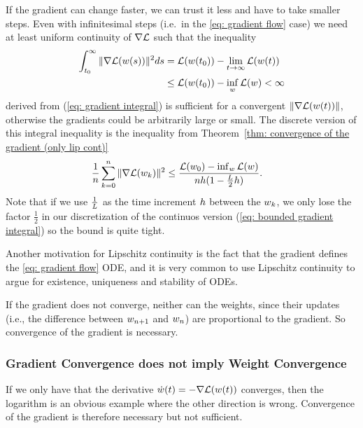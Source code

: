 If the gradient can change faster, we can trust it less and have to take smaller
steps. Even with infinitesimal steps (i.e.\ in the \ref{eq: gradient flow} case)
we need at least uniform continuity of \(\nabla\mathcal{L}\) such that the inequality
\begin{align}\label{eq: bounded gradient integral}
	\int_{t_0}^\infty \|\nabla \mathcal{L}(w(s))\|^2 ds
	&= \mathcal{L}(w(t_0)) - \lim_{t\to\infty} \mathcal{L}(w(t)) \\
	&\le \mathcal{L}(w(t_0)) - \inf_{w} \mathcal{L}(w) < \infty \nonumber
\end{align}
%
derived from (\ref{eq: gradient integral}) is sufficient for a convergent
\(\|\nabla \mathcal{L}(w(t))\|\), otherwise the gradients could be arbitrarily
large or small. The discrete version of this integral inequality is the inequality
from Theorem~\ref{thm: convergence of the gradient (only lip cont)}
\begin{align*}
	\frac1{n}\sum_{k=0}^n \|\nabla\mathcal{L}(w_k)\|^2
	&\le \frac{\mathcal{L}(w_0) - \inf_{w}\mathcal{L}(w)}{nh(1-\tfrac{L}2h)}.
\end{align*} 
Note that if we use \(\tfrac{1}{L}\) as the time increment \(h\)
between the \(w_k\), we only lose the factor \(\tfrac12\) in our
discretization of the continuos version (\ref{eq: bounded gradient integral}) so
the bound is quite tight.

Another motivation for Lipschitz continuity is the fact that the gradient defines
the \ref{eq: gradient flow} ODE, and it is very common to use Lipschitz
continuity to argue for existence, uniqueness and stability of ODEs.

If the gradient does not converge, neither can the weights, since their updates
(i.e., the difference between \(w_{n+1}\) and \(w_n\))
are proportional to the gradient. So convergence of the gradient is necessary.

\subsubsection{Gradient Convergence does not imply Weight Convergence}

If we only have that the derivative \(\dot{w}(t) = -\nabla \mathcal{L}(w(t))\)
converges, then the logarithm is an obvious example where the other direction
is wrong. Convergence of the gradient is therefore necessary but not
sufficient.

